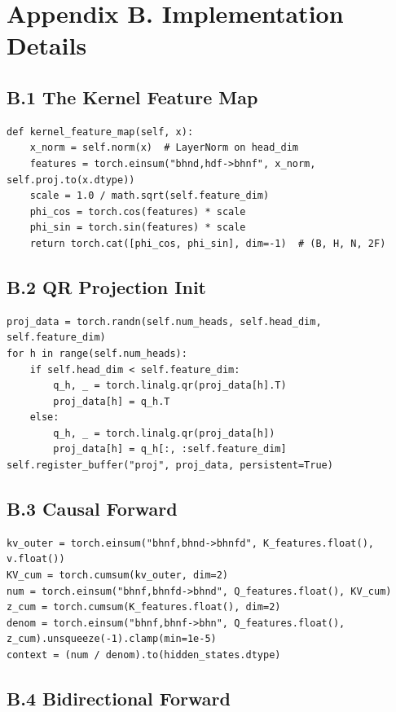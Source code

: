 \section{Appendix B. Implementation Details}

\subsection{B.1 The Kernel Feature Map}

\begin{lstlisting}
def kernel_feature_map(self, x):
    x_norm = self.norm(x)  # LayerNorm on head_dim
    features = torch.einsum("bhnd,hdf->bhnf", x_norm, self.proj.to(x.dtype))
    scale = 1.0 / math.sqrt(self.feature_dim)
    phi_cos = torch.cos(features) * scale
    phi_sin = torch.sin(features) * scale
    return torch.cat([phi_cos, phi_sin], dim=-1)  # (B, H, N, 2F)
\end{lstlisting}

\subsection{B.2 QR Projection Init}

\begin{lstlisting}
proj_data = torch.randn(self.num_heads, self.head_dim, self.feature_dim)
for h in range(self.num_heads):
    if self.head_dim < self.feature_dim:
        q_h, _ = torch.linalg.qr(proj_data[h].T)
        proj_data[h] = q_h.T
    else:
        q_h, _ = torch.linalg.qr(proj_data[h])
        proj_data[h] = q_h[:, :self.feature_dim]
self.register_buffer("proj", proj_data, persistent=True)
\end{lstlisting}

\subsection{B.3 Causal Forward}

\begin{lstlisting}
kv_outer = torch.einsum("bhnf,bhnd->bhnfd", K_features.float(), v.float())
KV_cum = torch.cumsum(kv_outer, dim=2)
num = torch.einsum("bhnf,bhnfd->bhnd", Q_features.float(), KV_cum)
z_cum = torch.cumsum(K_features.float(), dim=2)
denom = torch.einsum("bhnf,bhnf->bhn", Q_features.float(), z_cum).unsqueeze(-1).clamp(min=1e-5)
context = (num / denom).to(hidden_states.dtype)
\end{lstlisting}

\subsection{B.4 Bidirectional Forward}

